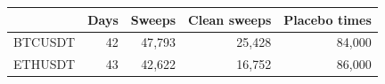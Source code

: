 \begin{tabular}{lrrrr}
\toprule
 & Days & Sweeps & Clean sweeps & Placebo times \\
\midrule
BTCUSDT & 42 & 47{,}793 & 25{,}428 & 84{,}000 \\
ETHUSDT & 43 & 42{,}622 & 16{,}752 & 86{,}000 \\
\bottomrule
\end{tabular}
